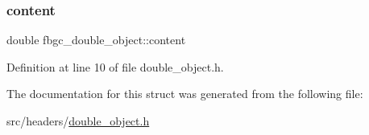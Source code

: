 \mbox{\label{structfbgc__double__object_a839dc9f0b67fc0e959e909111fd7d35c}} 
\subsubsection{\texorpdfstring{content}{content}}
{\footnotesize\ttfamily double fbgc\+\_\+double\+\_\+object\+::content}



Definition at line 10 of file double\+\_\+object.\+h.



The documentation for this struct was generated from the following file\+:\begin{DoxyCompactItemize}
\item 
src/headers/\hyperlink{double__object_8h}{double\+\_\+object.\+h}\end{DoxyCompactItemize}
